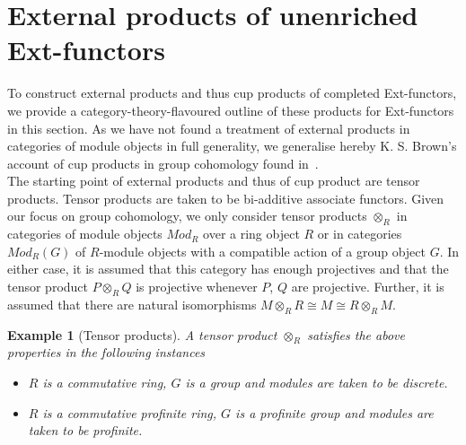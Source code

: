 \documentclass[12pt, a4paper]{article}
\numberwithin{equation}{section}
\newtheorem{exl}[thm]{Example}
\theoremstyle{empty}
\theoremstyle{nonumberplain}
\begin{document}
\section{External products of unenriched Ext-functors}\label{sec:ordinarycohomprods}

To construct external products and thus cup products of completed Ext-functors, we provide a category-theory-flavoured outline of these products for Ext-functors in this section. As we have not found a treatment of external products in categories of module objects in full generality, we generalise hereby K.\! S.\! Brown's account of cup products in group cohomology found in~\cite[Chapter~V]{bro82}. \\

The starting point of external products and thus of cup product are tensor products. Tensor products are taken to be bi-additive associate functors. Given our focus on group cohomology, we only consider tensor products $\otimes_R$ in categories of module objects $Mod_R$ over a ring object $R$ or in categories $Mod_R(G)$ of $R$-module objects with a compatible action of a group object $G$. In either case, it is assumed that this category has enough projectives and that the tensor product $P \otimes_R Q$ is projective whenever $P$, $Q$ are projective. Further, it is assumed that there are natural isomorphisms $M \otimes_R R \cong M \cong R \otimes_R M$.

\begin{exl}[Tensor products]\label{exl:tensorprods}
A tensor product $\otimes_R$ satisfies the above properties in the following instances
\begin{itemize}
\item $R$ is a commutative ring, $G$ is a group and modules are taken to be discrete.
\item $R$ is a commutative profinite ring, $G$ is a profinite group and modules are taken to be profinite.
\end{itemize}
\end{exl}
\end{document}
